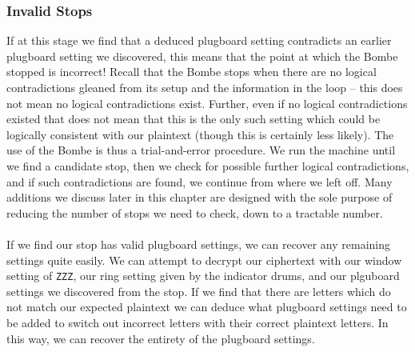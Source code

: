 
\subsubsection{Invalid Stops}
If at this stage we find that a deduced plugboard setting contradicts
an earlier plugboard setting we discovered, this means that the point
at which the Bombe stopped is incorrect! Recall that the Bombe stops
when there are no logical contradictions gleaned from its setup and
the information in the loop -- this does not mean no logical
contradictions exist. Further, even if no logical contradictions
existed that does not mean that this is the only such setting which could
be logically consistent with our plaintext (though this is certainly
less likely). The use of the Bombe is thus a trial-and-error
procedure. We run the machine until we find a candidate stop, then we
check for possible further logical contradictions, and if such
contradictions are found, we continue from where we left off. Many
additions we discuss later in this chapter are designed with the sole
purpose of reducing the number of stops we need to check, down to a
tractable number.
\\\\If we find our stop has valid plugboard settings, we can recover
any remaining settings quite easily. We can attempt to decrypt our
ciphertext with our window setting of \texttt{ZZZ}, our ring setting
given by the indicator drums, and our plguboard settings we
discovered from the stop. If we find that there are letters which do
not match our expected plaintext we can deduce what plugboard
settings need to be added to switch out incorrect letters with their
correct plaintext letters. In this way, we can recover the entirety of
the plugboard settings.


